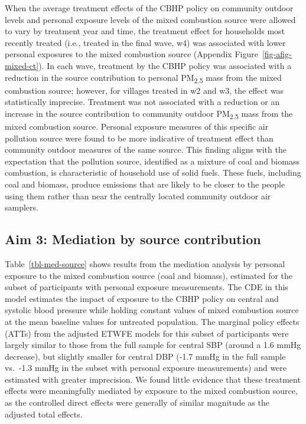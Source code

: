 \documentclass[
  letterpaper,
  DIV=11,
  numbers=noendperiod]{scrartcl}
\begin{document}
When the average treatment effects of the CBHP policy on community
outdoor levels and personal exposure levels of the mixed combustion
source were allowed to vary by treatment year and time, the treatment
effect for households most recently treated (i.e., treated in the final
wave, w4) was associated with lower personal exposures to the mixed
combustion source (Appendix Figure~\ref{fig-afig-mixed-ct}). In each
wave, treatment by the CBHP policy was associated with a reduction in
the source contribution to personal PM\textsubscript{2.5} mass from the
mixed combustion source; however, for villages treated in w2 and w3, the
effect was statistically imprecise. Treatment was not associated with a
reduction or an increase in the source contribution to community outdoor
PM\textsubscript{2.5} mass from the mixed combustion source. Personal
exposure measures of this specific air pollution source were found to be
more indicative of treatment effect than community outdoor measures of
the same source. This finding aligns with the expectation that the
pollution source, identified as a mixture of coal and biomass
combustion, is characteristic of household use of solid fuels. These
fuels, including coal and biomass, produce emissions that are likely to
be closer to the people using them rather than near the centrally
located community outdoor air samplers.

\hypertarget{aim-3-mediation-by-source-contribution}{%
\subsection{Aim 3: Mediation by source
contribution}\label{aim-3-mediation-by-source-contribution}}

Table~\ref{tbl-med-source} shows results from the mediation analysis by
personal exposure to the mixed combustion source (coal and biomass),
estimated for the subset of participants with personal exposure
measurements. The CDE in this model estimates the impact of exposure to
the CBHP policy on central and systolic blood pressure while holding
constant values of mixed combustion source at the mean baseline values
for untreated population. The marginal policy effects (ATTs) from the
adjusted ETWFE models for this subset of participants were largely
similar to those from the full sample for central SBP (around a 1.6 mmHg
decrease), but slightly smaller for central DBP (-1.7 mmHg in the full
sample vs.~-1.3 mmHg in the subset with personal exposure measurements)
and were estimated with greater imprecision. We found little evidence
that these treatment effects were meaningfully mediated by exposure to
the mixed combustion source, as the controlled direct effects were
generally of similar magnitude as the adjusted total effects.
\end{document}
